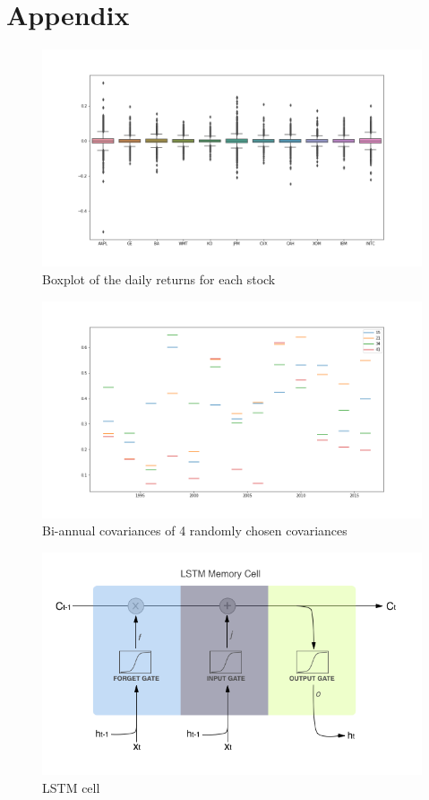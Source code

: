 \section{Appendix}

\begin{figure}[ht]
\centering
\includegraphics[scale=0.45]{figures/boxplot.png}
\caption{Boxplot of the daily returns for each stock}
\label{fig:returns_boxplots}
\end{figure}

\begin{figure}[ht]
\centering
\includegraphics[scale=0.45]{figures/structural_breaks_covars.png}
\caption{Bi-annual covariances of 4 randomly chosen covariances}
\label{fig:structuralbreakscovariances}
\end{figure}

\begin{figure}[ht]
\centering
\includegraphics[scale=0.45]{figures/LSTM_cell.png}
\caption{LSTM cell}
\label{fig:lstmcell}
\end{figure}


